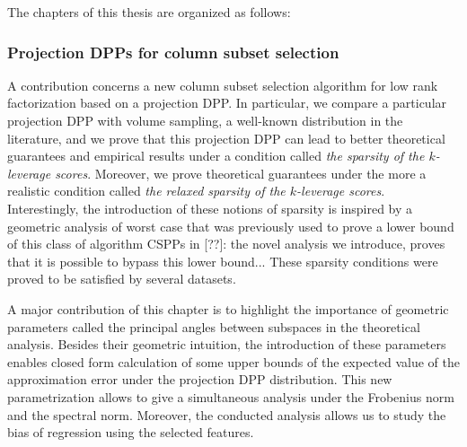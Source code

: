 \documentclass[twoside,11pt]{book}
\numberwithin{theorem}{chapter}
\numberwithin{definition}{chapter}
\numberwithin{proposition}{chapter}
\numberwithin{corollary}{chapter}
\numberwithin{example}{chapter}
\numberwithin{lemma}{chapter}
\begin{document}
The chapters of this thesis are organized as follows:
\subsubsection{Projection DPPs for column subset selection}
A contribution concerns a new column subset selection algorithm for low rank factorization based on a projection DPP. 
In particular, we compare a particular projection DPP with volume sampling, a well-known distribution in the literature, and we prove that this projection DPP can lead to better theoretical guarantees and empirical results under a condition called \emph{the sparsity of the $k$-leverage scores}. Moreover, we prove theoretical guarantees under the more a realistic condition called \emph{the relaxed sparsity of the $k$-leverage scores}. Interestingly, the introduction of these notions of sparsity is inspired by a geometric analysis of worst case that was previously used to prove a lower bound of this class of algorithm CSPPs in [??]: the novel analysis we introduce, proves that it is possible to bypass this lower bound... These sparsity conditions were proved to be satisfied by several datasets. 

A major contribution of this chapter is to highlight the importance of geometric parameters called the principal angles between subspaces in the theoretical analysis. Besides their geometric intuition, the introduction of these parameters enables closed form calculation of some upper bounds of the expected value of the approximation error under the projection DPP distribution.
This new parametrization allows to give a simultaneous analysis under the Frobenius norm and the spectral norm. Moreover, the conducted analysis allows us to study the bias of regression using the selected features.





\end{document}
